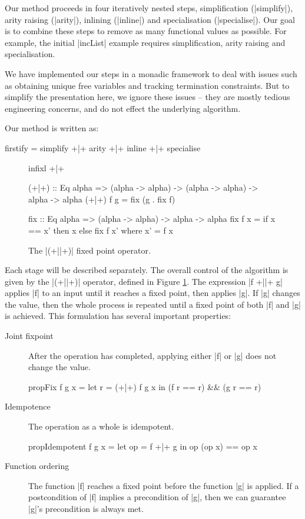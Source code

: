 Our method proceeds in four iteratively nested steps, simplification (|simplify|), arity raising (|arity|), inlining (|inline|) and specialisation (|specialise|). Our goal is to combine these steps to remove as many functional values as possible. For example, the initial |incList| example requires simplification, arity raising and specialisation.

We have implemented our steps in a monadic framework to deal with issues such as obtaining unique free variables and tracking termination constraints. But to simplify the presentation here, we ignore these issues -- they are mostly tedious engineering concerns, and do not effect the underlying algorithm.

Our method is written as:

\begin{code}
firstify = simplify +|+ arity +|+ inline +|+ specialise
\end{code}

\begin{figure}
\begin{code}
infixl +|+

(+|+) :: Eq alpha => (alpha -> alpha) -> (alpha -> alpha) -> alpha -> alpha
(+|+) f g = fix (g . fix f)

fix :: Eq alpha => (alpha -> alpha) -> alpha -> alpha
fix f x = if x == x' then x else fix f x'
    where x' = f x
\end{code}
\caption{The |(+||+)| fixed point operator.}
\label{figF:fixp_op}
\end{figure}

Each stage will be described separately. The overall control of the algorithm is given by the |(+||+)| operator, defined in Figure \ref{figF:fixp_op}. The expression |f +||+ g| applies |f| to an input until it reaches a fixed point, then applies |g|. If |g| changes the value, then the whole process is repeated until a fixed point of both |f| and |g| is achieved. This formulation has several important properties:

\begin{description}
\item[Joint fixpoint] After the operation has completed, applying either |f| or |g| does not change the value.

\begin{code}
propFix f g x = let r = (+|+) f g x in (f r == r) && (g r == r)
\end{code}

\item[Idempotence] The operation as a whole is idempotent.

\begin{code}
propIdempotent f g x = let op = f +|+ g in op (op x) == op x
\end{code}

\item[Function ordering] The function |f| reaches a fixed point before the function |g| is applied. If a postcondition of |f| implies a precondition of |g|, then we can guarantee |g|'s precondition is always met.
\end{description}

